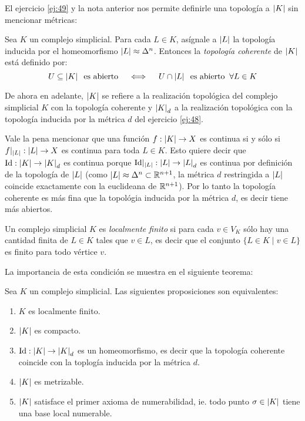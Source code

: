 \documentclass[../../topologia_algebraica]{subfiles}
\begin{document}
El ejercicio \ref{ej:49} y la nota anterior nos permite definirle una topolog\'ia a $\left| K \right|$ sin
mencionar m\'etricas:

\begin{defin}
  Sea $K$ un complejo simplicial. Para cada $L\in K$, as\'ignale a $\left| L \right|$ la topolog\'ia
  inducida por el homeomorfismo $\left| L \right|\approx\Delta^n$. Entonces la \emph{topolog\'ia coherente}
  de $\left| K \right|$ est\'a definido por:
  \[
    U\subseteq\left| K \right|\;\;\text{es abierto} \quad\iff\quad
    U\cap\left| L \right|\;\;\text{es abierto}\;\;\forall L\in K
  \]
\end{defin}

\begin{nota}
  De ahora en adelante, $\left| K \right|$ se refiere a la realizaci\'on topol\'ogica del complejo simplicial
  $K$ con la topolog\'ia coherente y $\left| K \right|_d$ a la realizaci\'on topol\'ogica con la topolog\'ia
  inducida por la m\'etrica $d$ del ejercicio \ref{ej:48}.
\end{nota}

\begin{nota}
  Vale la pena mencionar que una funci\'on $f:\left| K \right|\rightarrow X$ es continua si y s\'olo si
  $f|_{\left| L \right|}:\left| L \right|\rightarrow X$ es continua para toda $L\in K$. Esto quiere decir que
  $\text{Id}:\left| K \right|\rightarrow\left| K \right|_d$ es continua porque $\text{Id}|_{\left| L \right|}:\left| L \right|\rightarrow\left| L \right|_d$ es continua por
  definici\'on de la topolog\'ia de $\left| L \right|$ (como $\left| L \right|\approx\Delta^n\subset\mathbb{R}^{n+1}$, la
  m\'etrica $d$ restringida a $\left| L \right|$ coincide exactamente con la euclideana de $\mathbb{R}^{n+1}$).
  Por lo tanto la topolog\'ia coherente es m\'as fina que la topol\'ogia inducida por la m\'etrica
  $d$, es decir tiene m\'as abiertos.
\end{nota}

\begin{defin}
  Un complejo simplicial $K$ es \emph{localmente finito} si para cada $v\in V_K$ s\'olo hay una
  cantidad finita de $L\in K$ tales que $v\in L$, es decir que el conjunto $\{L\in K\mid v\in L\}$
  es finito para todo v\'ertice $v$.
\end{defin}
 
La importancia de esta condici\'on se muestra en el siguiente teorema:

\begin{thm}\label{thm:complejos_localmente_finitos}
  Sea $K$ un complejo simplicial. Las siguientes proposiciones son equivalentes:
  \begin{enumerate}
  \item $K$ es localmente finito.
  \item $\left| K \right|$ es compacto.
  \item $\text{Id}:\left| K \right|\rightarrow\left| K \right|_d$ es un homeomorfismo, es decir que la topolog\'ia coherente
    coincide con la toplog\'ia inducida por la m\'etrica $d$.
  \item $\left| K \right|$ es metrizable.
  \item $\left| K \right|$ satisface el primer axioma de numerabilidad, ie. todo punto $\sigma\in\left| K \right|$
    tiene una base local numerable.
  \end{enumerate}
\end{thm}
\end{document}
